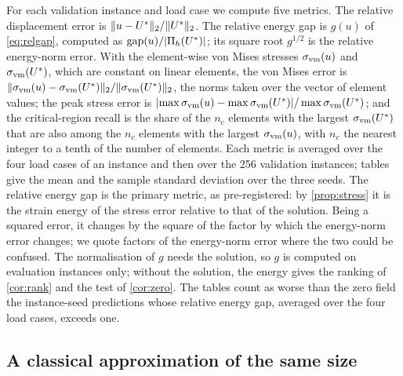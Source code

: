 For each validation instance and load case we compute five metrics. The relative
displacement error is $\lVert u-U^{\ast}\rVert_2/\lVert U^{\ast}\rVert_2$. The relative energy gap is $g(u)$
of \eqref{eq:relgap}, computed as $\operatorname{gap}(u)/\lvert\Pi_h(U^{\ast})\rvert$; its square root
$g^{1/2}$ is the relative energy-norm error. With the element-wise von Mises stresses
$\sigma_{\mathrm{vm}}(u)$ and $\sigma_{\mathrm{vm}}(U^{\ast})$, which are constant on linear elements, the von Mises error is
$\lVert \sigma_{\mathrm{vm}}(u)-\sigma_{\mathrm{vm}}(U^{\ast})\rVert_2/\lVert \sigma_{\mathrm{vm}}(U^{\ast})\rVert_2$, the norms taken over the vector of
element values; the peak stress error is
$\lvert\max\sigma_{\mathrm{vm}}(u)-\max\sigma_{\mathrm{vm}}(U^{\ast})\rvert/\max\sigma_{\mathrm{vm}}(U^{\ast})$; and the critical-region recall is
the share of the $n_c$ elements with the largest $\sigma_{\mathrm{vm}}(U^{\ast})$ that are also among the $n_c$
elements with the largest $\sigma_{\mathrm{vm}}(u)$, with $n_c$ the nearest integer to a tenth of the number
of elements. Each metric is averaged over the four load cases of an instance and then over
the 256 validation instances; tables give the mean and the sample standard deviation over
the three seeds. The relative energy gap is the primary metric, as pre-registered: by
\cref{prop:stress} it is the strain energy of the stress error relative to that of the
solution. Being a squared error, it changes by the square of the factor by which the
energy-norm error changes; we quote factors of the energy-norm error where the two could be
confused. The normalisation of $g$ needs the solution, so $g$ is computed on evaluation
instances only; without the solution, the energy gives the ranking of \cref{cor:rank} and
the test of \cref{cor:zero}. The tables count as worse than the zero field the instance-seed
predictions whose relative energy gap, averaged over the four load cases, exceeds one.

\subsection{A classical approximation of the same size}\label{sec:methods:ritz}

